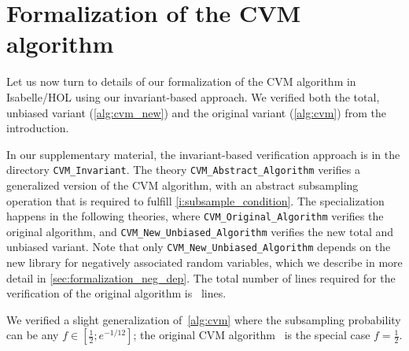 \section{Formalization of the CVM algorithm}\label{sec:formalization}
Let us now turn to details of our formalization of the CVM algorithm in Isabelle/HOL using our invariant-based approach.
We verified both the total, unbiased variant (\cref{alg:cvm_new}) and the original variant (\cref{alg:cvm}) from the introduction.

\begin{note}
In our supplementary material, the invariant-based verification approach is in the directory \verb|CVM_Invariant|.
The theory \verb|CVM_Abstract_Algorithm| verifies a generalized version of the CVM algorithm, with an abstract subsampling operation that is required to fulfill \cref{i:subsample_condition}.
The specialization happens in the following theories, where \verb|CVM_Original_Algorithm| verifies the original algorithm, and \verb|CVM_New_Unbiased_Algorithm| verifies the new total and unbiased variant.
Note that only \verb|CVM_New_Unbiased_Algorithm| depends on the new library for negatively associated random variables, which we describe in more detail in \cref{sec:formalization_neg_dep}.
The total number of lines required for the verification of the original algorithm is \locnew~lines.
\lipicsEnd\end{note}

We verified a slight generalization of~\cref{alg:cvm} where the subsampling probability can be any $f \in [\frac{1}{2};e^{-1/12}]$; the original CVM algorithm~\cite{chakraborty2022} is the special case $f=\frac{1}{2}$.

